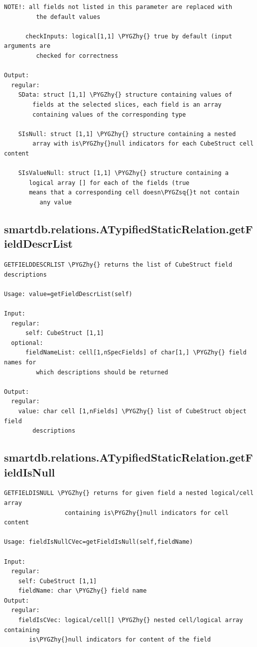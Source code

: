 \documentclass[letterpaper,10pt,english]{sphinxmanual}
\def\PYGZhy{\char`\-}
\def\PYGZsq{\char`\'}
\begin{document}
\begin{Verbatim}[commandchars=\\\{\}]
         NOTE!: all fields not listed in this parameter are replaced with
         the default values

      checkInputs: logical[1,1] \PYGZhy{} true by default (input arguments are
         checked for correctness

Output:
  regular:
    SData: struct [1,1] \PYGZhy{} structure containing values of
        fields at the selected slices, each field is an array
        containing values of the corresponding type

    SIsNull: struct [1,1] \PYGZhy{} structure containing a nested
        array with is\PYGZhy{}null indicators for each CubeStruct cell content

    SIsValueNull: struct [1,1] \PYGZhy{} structure containing a
       logical array [] for each of the fields (true
       means that a corresponding cell doesn\PYGZsq{}t not contain
          any value
\end{Verbatim}


\subsection{smartdb.relations.ATypifiedStaticRelation.getFieldDescrList}
\label{chap_functions:smartdb-relations-atypifiedstaticrelation-getfielddescrlist}
\begin{Verbatim}[commandchars=\\\{\}]
GETFIELDDESCRLIST \PYGZhy{} returns the list of CubeStruct field descriptions

Usage: value=getFieldDescrList(self)

Input:
  regular:
      self: CubeStruct [1,1]
  optional:
      fieldNameList: cell[1,nSpecFields] of char[1,] \PYGZhy{} field names for
         which descriptions should be returned

Output:
  regular:
    value: char cell [1,nFields] \PYGZhy{} list of CubeStruct object field
        descriptions
\end{Verbatim}


\subsection{smartdb.relations.ATypifiedStaticRelation.getFieldIsNull}
\label{chap_functions:smartdb-relations-atypifiedstaticrelation-getfieldisnull}
\begin{Verbatim}[commandchars=\\\{\}]
GETFIELDISNULL \PYGZhy{} returns for given field a nested logical/cell array
                 containing is\PYGZhy{}null indicators for cell content

Usage: fieldIsNullCVec=getFieldIsNull(self,fieldName)

Input:
  regular:
    self: CubeStruct [1,1]
    fieldName: char \PYGZhy{} field name
Output:
  regular:
    fieldIsCVec: logical/cell[] \PYGZhy{} nested cell/logical array containing
       is\PYGZhy{}null indicators for content of the field
\end{Verbatim}
\end{document}
